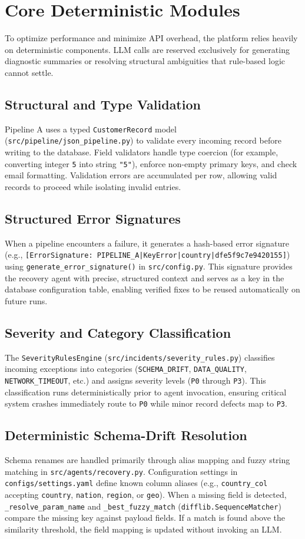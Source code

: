\documentclass[11pt]{article}
\newcommand{\code}[1]{\texttt{\small #1}}
\begin{document}
\section{Core Deterministic Modules}
To optimize performance and minimize API overhead, the platform relies heavily on deterministic components. LLM calls are reserved exclusively for generating diagnostic summaries or resolving structural ambiguities that rule-based logic cannot settle.

\subsection{Structural and Type Validation}
Pipeline A uses a typed \code{CustomerRecord} model (\code{src/pipeline/json\_pipeline.py}) to validate every incoming record before writing to the database. Field validators handle type coercion (for example, converting integer \code{5} into string \code{"5"}), enforce non-empty primary keys, and check email formatting. Validation errors are accumulated per row, allowing valid records to proceed while isolating invalid entries.

\subsection{Structured Error Signatures}
When a pipeline encounters a failure, it generates a hash-based error signature (e.g., \code{[ErrorSignature: PIPELINE\_A|KeyError|country|dfe5f9c7e9420155]}) using \code{generate\_error\_signature()} in \code{src/config.py}. This signature provides the recovery agent with precise, structured context and serves as a key in the database configuration table, enabling verified fixes to be reused automatically on future runs.

\subsection{Severity and Category Classification}
The \code{SeverityRulesEngine} (\code{src/incidents/severity\_rules.py}) classifies incoming exceptions into categories (\code{SCHEMA\_DRIFT}, \code{DATA\_QUALITY}, \code{NETWORK\_TIMEOUT}, etc.) and assigns severity levels (\code{P0} through \code{P3}). This classification runs deterministically prior to agent invocation, ensuring critical system crashes immediately route to \code{P0} while minor record defects map to \code{P3}.

\subsection{Deterministic Schema-Drift Resolution}
Schema renames are handled primarily through alias mapping and fuzzy string matching in \code{src/agents/recovery.py}. Configuration settings in \code{configs/settings.yaml} define known column aliases (e.g., \code{country\_col} accepting \code{country}, \code{nation}, \code{region}, or \code{geo}). When a missing field is detected, \code{\_resolve\_param\_name} and \code{\_best\_fuzzy\_match} (\code{difflib.SequenceMatcher}) compare the missing key against payload fields. If a match is found above the similarity threshold, the field mapping is updated without invoking an LLM.
\end{document}
